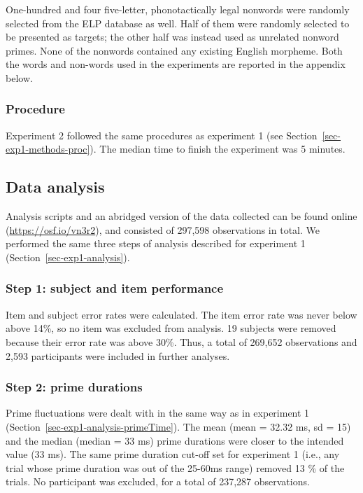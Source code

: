 \documentclass[
]{interact}
\begin{document}
One-hundred and four five-letter, phonotactically legal nonwords were
randomly selected from the ELP database as well. Half of them were
randomly selected to be presented as targets; the other half was instead
used as unrelated nonword primes. None of the nonwords contained any
existing English morpheme. Both the words and non-words used in the
experiments are reported in the appendix below.

\subsubsection{Procedure}\label{sec-exp2-methods-proc}

Experiment 2 followed the same procedures as experiment 1 (see
Section~\ref{sec-exp1-methods-proc}). The median time to finish the
experiment was 5 minutes.

\subsection{Data analysis}\label{sec-exp2-analysis}

Analysis scripts and an abridged version of the data collected can be
found online (\url{https://osf.io/vn3r2}), and consisted of 297,598
observations in total. We performed the same three steps of analysis
described for experiment 1 (Section~\ref{sec-exp1-analysis}).

\subsubsection{Step 1: subject and item
performance}\label{sec-exp2-analysis-performance}

Item and subject error rates were calculated. The item error rate was
never below above 14\%, so no item was excluded from analysis. 19
subjects were removed because their error rate was above 30\%. Thus, a
total of 269,652 observations and 2,593 participants were included in
further analyses.

\subsubsection{Step 2: prime
durations}\label{sec-exp2-analysis-primeTime}

Prime fluctuations were dealt with in the same way as in experiment 1
(Section~\ref{sec-exp1-analysis-primeTime}). The mean (mean = 32.32 ms,
sd = 15) and the median (median = 33 ms) prime durations were closer to
the intended value (33 ms). The same prime duration cut-off set for
experiment 1 (i.e., any trial whose prime duration was out of the
25-60ms range) removed 13 \% of the trials. No participant was excluded,
for a total of 237,287 observations.
\end{document}
